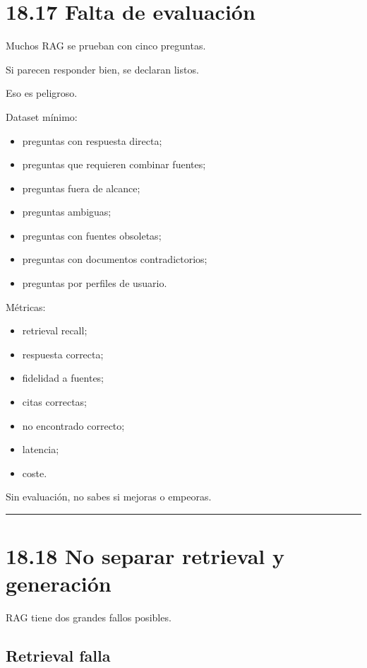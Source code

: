 \section{18.17 Falta de evaluación}\label{falta-de-evaluaciuxf3n}

Muchos RAG se prueban con cinco preguntas.

Si parecen responder bien, se declaran listos.

Eso es peligroso.

Dataset mínimo:

\begin{itemize}
\tightlist
\item
  preguntas con respuesta directa;
\item
  preguntas que requieren combinar fuentes;
\item
  preguntas fuera de alcance;
\item
  preguntas ambiguas;
\item
  preguntas con fuentes obsoletas;
\item
  preguntas con documentos contradictorios;
\item
  preguntas por perfiles de usuario.
\end{itemize}

Métricas:

\begin{itemize}
\tightlist
\item
  retrieval recall;
\item
  respuesta correcta;
\item
  fidelidad a fuentes;
\item
  citas correctas;
\item
  no encontrado correcto;
\item
  latencia;
\item
  coste.
\end{itemize}

Sin evaluación, no sabes si mejoras o empeoras.

\begin{center}\rule{0.5\linewidth}{0.5pt}\end{center}

\section{18.18 No separar retrieval y
generación}\label{no-separar-retrieval-y-generaciuxf3n}

RAG tiene dos grandes fallos posibles.

\subsection{Retrieval falla}\label{retrieval-falla}

